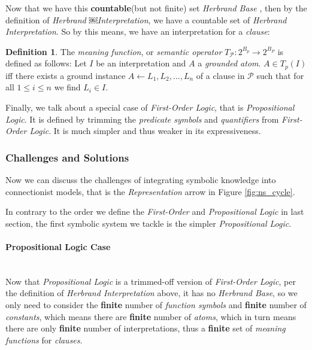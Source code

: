 \documentclass[letterpaper,10pt]{article}
\theoremstyle{definition}
\newtheorem{defn}{Definition}
\begin{document}
Now that we have this \textbf{countable}(but not finite) set \emph{Herbrand Base}
, then by the definition of \emph{Herbrand ￼Interpretation}, we have a countable set of \emph{Herbrand Interpretation}. So by this means, we have an interpretation for a \emph{clause}:

\begin{defn}
	The \emph{meaning function}, or \emph{semantic operator} $T_{\mathcal{P}}: 2^{B_p} \rightarrow 2^{B_P}$ is defined as follows: Let $I$ be an interpretation and $A$ a \emph{grounded atom}. $A \in T_p(I)$ iff there exists a ground instance  $A \leftarrow L_1, L_2, ..., L_n$ of a clause in $\mathcal{P}$ such that for all $1 \le i \le n$ we find $L_i \in I$.
\end{defn}

Finally, we talk about a special case of \emph{First-Order Logic}, that is \emph{Propositional Logic}. It is defined by trimming the \emph{predicate symbols} and \emph{quantifiers} from \emph{First-Order Logic}. It is much simpler and thus weaker in its expressiveness.

\subsubsection{Challenges and Solutions}

Now we can discuss the challenges of integrating symbolic knowledge into connectionist models, that is the \emph{Representation} arrow in Figure \ref{fig:ns_cycle}. 

In contrary to the order we define the \emph{First-Order} and \emph{Propositional Logic} in last section, the first symbolic system we tackle is the simpler \emph{Propositional Logic}. 

\paragraph{Propositional Logic Case}\leavevmode\\

Now that \emph{Propositional Logic} is a trimmed-off version of \emph{First-Order
Logic}, per the definition of \emph{Herbrand Interpretation} above, it has no
\emph{Herbrand Base}, so we only need to consider the \textbf{finite} number of 
\emph{function symbols} and \textbf{finite} number of \emph{constants}, which
means there are \textbf{finite} number of \emph{atoms}, which in turn means there
are only \textbf{finite} number of interpretations, thus a \textbf{finite} set of \emph{meaning functions} for \emph{clauses}. 
\end{document}
